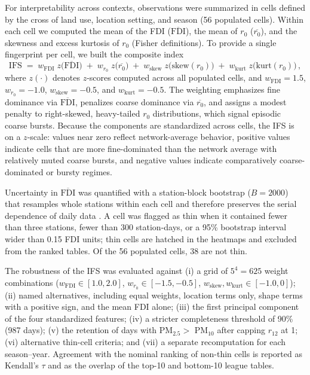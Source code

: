 \documentclass[a4paper,fleqn]{cas-sc}
\begin{document}
For interpretability across contexts, observations were summarized in cells defined by the cross of land use, location setting, and season (56 populated cells). Within each cell we computed the mean of the FDI ($\overline{\mathrm{FDI}}$), the mean of $r_0$ ($\overline{r_0}$), and the skewness and excess kurtosis of $r_0$ (Fisher definitions). To provide a single fingerprint per cell, we built the composite index
\begin{equation}
\mathrm{IFS} \;=\; w_{\mathrm{FDI}}\;z\!\big(\overline{\mathrm{FDI}}\big)
 \;+\; w_{r_0}\;z\!\big(\overline{r_{0}}\big)
 \;+\; w_{\mathrm{skew}}\;z\!\big(\mathrm{skew}(r_{0})\big)
 \;+\; w_{\mathrm{kurt}}\;z\!\big(\mathrm{kurt}(r_{0})\big)\,,
\end{equation}
where $z(\cdot)$ denotes $z$-scores computed across all populated cells, and $w_{\mathrm{FDI}}=1.5$, $w_{r_0}=-1.0$, $w_{\mathrm{skew}}=-0.5$, and $w_{\mathrm{kurt}}=-0.5$. The weighting emphasizes fine dominance via $\overline{\mathrm{FDI}}$, penalizes coarse dominance via $\overline{r_0}$, and assigns a modest penalty to right-skewed, heavy-tailed $r_0$ distributions, which signal episodic coarse bursts. Because the components are standardized across cells, the IFS is on a $z$-scale: values near zero reflect network-average behavior, positive values indicate cells that are more fine-dominated than the network average with relatively muted coarse bursts, and negative values indicate comparatively coarse-dominated or bursty regimes.

Uncertainty in $\overline{\mathrm{FDI}}$ was quantified with a station-block bootstrap ($B=2000$) that resamples whole stations within each cell and therefore preserves the serial dependence of daily data \citep{Efron1994}. A cell was flagged as thin when it contained fewer than three stations, fewer than 300 station-days, or a 95\% bootstrap interval wider than 0.15 FDI units; thin cells are hatched in the heatmaps and excluded from the ranked tables. Of the 56 populated cells, 38 are not thin.

The robustness of the IFS was evaluated against (i) a grid of $5^4=625$ weight combinations ($w_{\mathrm{FDI}}\in[1.0,2.0]$, $w_{r_0}\in[-1.5,-0.5]$, $w_{\mathrm{skew}},w_{\mathrm{kurt}}\in[-1.0,0]$); (ii) named alternatives, including equal weights, location terms only, shape terms with a positive sign, and the mean FDI alone; (iii) the first principal component of the four standardized features; (iv) a stricter completeness threshold of 90\% (987 days); (v) the retention of days with PM$_{2.5}>$ PM$_{10}$ after capping $r_{12}$ at 1; (vi) alternative thin-cell criteria; and (vii) a separate recomputation for each season--year. Agreement with the nominal ranking of non-thin cells is reported as Kendall's $\tau$ and as the overlap of the top-10 and bottom-10 league tables.
\end{document}
